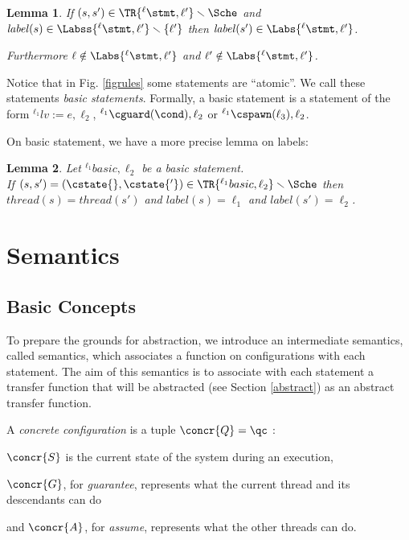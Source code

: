 \documentclass[12pt]{article}
\newcommand{\lab}{  {}^{\ell}}
\newcommand{\li}[1]{ {}^{\ell_{#1}}  }
\newcounter{labels}[figure]
\newcommand{\lbl}{\mathit{label}}
\newcommand{\thread}{\mathit{thread}}
\newtheorem{lemma}{Lemma}
\begin{document}
\begin{lemma}\label{lemma:Asub2}
 If \((s,s')\in\TR{\lab\stmt,\ell'}\smallsetminus \Sche\) and \(\lbl(s)\in\Labss{\lab\stmt,\ell'}\smallsetminus\{\ell'\}\) then \(\lbl(s')\in\Labs{\lab\stmt,\ell'}\).
 
 Furthermore \(\ell\notin\Labs{\lab\stmt,\ell'}\) and \(\ell'\notin\Labs{\lab\stmt,\ell'}\).
\end{lemma}


Notice that in Fig. \ref{figrules} some statements are ``atomic''. We call these statements \emph{basic statements}.
Formally, a basic statement is a statement of the form \(\li1 lv:=e,\ell_2\), \(\li1\cguard(\cond),\ell_2\) or \(\li1 \cspawn(\ell_3),\ell_2 \).

On basic statement, we have a more precise lemma on labels:
\begin{lemma}\label{lemma:A'}Let \(\li1 basic,\ell_2\) be a basic statement.\\
 If \((s,s')=(\cstate{},\cstate{'})\in \TR{\li1 basic,\ell_2}\smallsetminus\Sche\) then \(\thread(s)=\thread(s')\) and \(\lbl(s)=\ell_1\) and \(\lbl(s')=\ell_2\).
\end{lemma}


\section{\Cnamep Semantics}
\label{section:nonst}
 
 \subsection{Basic Concepts}
 
  \auxiliarydefs
 
 To prepare the grounds for abstraction, we introduce an intermediate semantics, 
 called \cname semantics, 
 which associates a function on configurations with each statement.
 The aim of this semantics is to associate with each statement a transfer function that will be abstracted 
 (see Section \ref{abstract}) 
 as an abstract transfer function.


A \emph{concrete configuration} is a tuple \(\concr{Q}=\qc\) :
\begin{inparaenum}
 \item \(\concr{S}\) is the current state of the system during an execution,
 \item \(\concr{G}\), for \emph{guarantee}, represents what the current thread and its descendants can do
 \item and \(\concr{A}\), for \emph{assume}, represents what the other threads can do.
\end{inparaenum}
\end{document}
